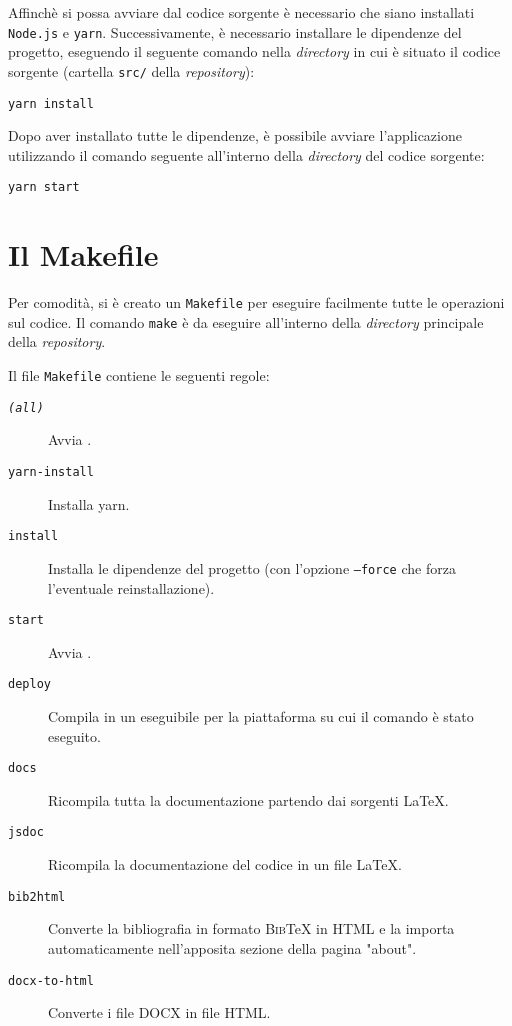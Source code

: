Affinchè si possa avviare \ProjectTitle{} dal codice sorgente è necessario che
siano installati \texttt{Node.js} e \texttt{yarn}. Successivamente, è necessario
installare le dipendenze del progetto, eseguendo il seguente comando nella
\textit{directory} in cui è situato il codice sorgente (cartella \texttt{src/}
della \textit{repository}):

\begin{lstlisting}
yarn install
\end{lstlisting}

Dopo aver installato tutte le dipendenze, è possibile avviare l'applicazione
utilizzando il comando seguente all'interno della \textit{directory} del codice
sorgente:

\begin{lstlisting}
yarn start
\end{lstlisting}

\section{Il Makefile}

Per comodità, si è creato un \texttt{Makefile} per eseguire facilmente tutte le
operazioni sul codice. Il comando \lstinline|make| è da eseguire all'interno
della \textit{directory} principale della \textit{repository}.

Il file \texttt{Makefile} contiene le seguenti regole:
\begin{description}
	\item[\texttt{\textit{(all)}}] Avvia \ProjectTitle{}.
	\item[\texttt{yarn-install}] Installa yarn. 
	\item[\texttt{install}] Installa le dipendenze del progetto (con l'opzione
	\texttt{--force} che forza l'eventuale reinstallazione).
	\item[\texttt{start}] Avvia \ProjectTitle{}.
	\item[\texttt{deploy}] Compila \ProjectTitle{} in un eseguibile per la
	piattaforma su cui il comando è stato eseguito.
	\item[\texttt{docs}] Ricompila tutta la documentazione partendo dai sorgenti
	\LaTeX.
	\item[\texttt{jsdoc}] Ricompila la documentazione del codice in un file
	\LaTeX.
	\item[\texttt{bib2html}] Converte la bibliografia in formato
	\textsc{Bib}\TeX{} in HTML e la importa automaticamente nell'apposita
	sezione della pagina "about".
	\item[\texttt{docx-to-html}] Converte i file DOCX in file HTML.
\end{description}